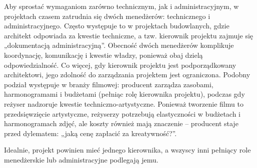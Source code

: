 Aby sprostać wymaganiom zarówno technicznym, jak i administracyjnym, w projektach czasem zatrudnia się dwóch menedżerów: technicznego i administracyjnego. Często występuje to w projektach budowlanych, gdzie architekt odpowiada za kwestie techniczne, a tzw. kierownik projektu zajmuje się „dokumentacją administracyjną”. Obecność dwóch menedżerów komplikuje koordynację, komunikację i kwestie władzy, ponieważ obaj dzielą odpowiedzialność. Co więcej, gdy kierownik projektu jest podporządkowany architektowi, jego zdolność do zarządzania projektem jest ograniczona. Podobny podział występuje w branży filmowej: producent zarządza zasobami, harmonogramami i budżetami (pełniąc rolę kierownika projektu), podczas gdy reżyser nadzoruje kwestie techniczno-artystyczne. Ponieważ tworzenie filmu to przedsięwzięcie artystyczne, reżyserzy potrzebują elastyczności w budżetach i harmonogramach zdjęć, ale koszty również mają znaczenie – producent staje przed dylematem: „jaką cenę zapłacić za kreatywność?”.

Idealnie, projekt powinien mieć jednego kierownika, a wszyscy inni pełniący role menedżerskie lub administracyjne podlegają jemu.\autocite{NicholasSteyn}